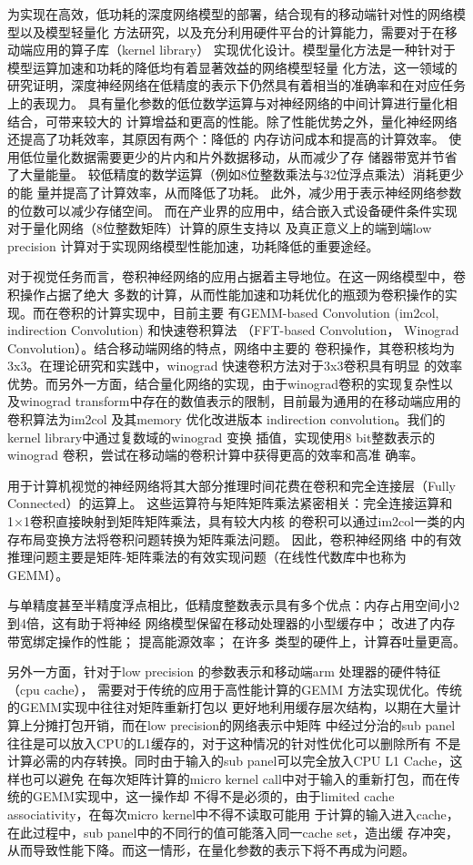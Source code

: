 为实现在高效，低功耗的深度网络模型的部署，结合现有的移动端针对性的网络模型以及模型轻量化
方法研究，以及充分利用硬件平台的计算能力，需要对于在移动端应用的算子库（kernel library）
实现优化设计。模型量化方法是一种针对于模型运算加速和功耗的降低均有着显著效益的网络模型轻量
化方法，这一领域的研究证明，深度神经网络在低精度的表示下仍然具有着相当的准确率和在对应任务
上的表现力。 具有量化参数的低位数学运算与对神经网络的中间计算进行量化相结合，可带来较大的
计算增益和更高的性能。除了性能优势之外，量化神经网络还提高了功耗效率，其原因有两个：降低的
内存访问成本和提高的计算效率。 使用低位量化数据需要更少的片内和片外数据移动，从而减少了存
储器带宽并节省了大量能量。 较低精度的数学运算（例如8位整数乘法与32位浮点乘法）消耗更少的能
量并提高了计算效率，从而降低了功耗。 此外，减少用于表示神经网络参数的位数可以减少存储空间。
而在产业界的应用中，结合嵌入式设备硬件条件实现对于量化网络（8位整数矩阵）计算的原生支持以
及真正意义上的端到端low precision 计算对于实现网络模型性能加速，功耗降低的重要途经。

对于视觉任务而言，卷积神经网络的应用占据着主导地位。在这一网络模型中，卷积操作占据了绝大
多数的计算，从而性能加速和功耗优化的瓶颈为卷积操作的实现。而在卷积的计算实现中，目前主要
有GEMM-based Convolution (im2col, indirection Convolution) 和快速卷积算法
（FFT-based Convolution， Winograd Convolution）。结合移动端网络的特点，网络中主要的
卷积操作，其卷积核均为3x3。在理论研究和实践中，winograd 快速卷积方法对于3x3卷积具有明显
的效率优势。而另外一方面，结合量化网络的实现，由于winograd卷积的实现复杂性以及winograd 
transform中存在的数值表示的限制，目前最为通用的在移动端应用的卷积算法为im2col 及其memory 
优化改进版本 indirection convolution。我们的kernel library中通过复数域的winograd 变换
插值，实现使用8 bit整数表示的winograd 卷积，尝试在移动端的卷积计算中获得更高的效率和高准
确率。

用于计算机视觉的神经网络将其大部分推理时间花费在卷积和完全连接层（Fully Connected）的运算上。
这些运算符与矩阵矩阵乘法紧密相关：完全连接运算和1×1卷积直接映射到矩阵矩阵乘法，具有较大内核
的卷积可以通过im2col一类的内存布局变换方法将卷积问题转换为矩阵乘法问题。 因此，卷积神经网络
中的有效推理问题主要是矩阵-矩阵乘法的有效实现问题（在线性代数库中也称为GEMM）。

与单精度甚至半精度浮点相比，低精度整数表示具有多个优点：内存占用空间小2到4倍，这有助于将神经
网络模型保留在移动处理器的小型缓存中； 改进了内存带宽绑定操作的性能； 提高能源效率； 在许多
类型的硬件上，计算吞吐量更高。


另外一方面，针对于low precision 的参数表示和移动端arm 处理器的硬件特征（cpu cache），
需要对于传统的应用于高性能计算的GEMM 方法实现优化。传统的GEMM实现中往往对矩阵重新打包以
更好地利用缓存层次结构，以期在大量计算上分摊打包开销，而在low precision的网络表示中矩阵
中经过分治的sub panel往往是可以放入CPU的L1缓存的，对于这种情况的针对性优化可以删除所有
不是计算必需的内存转换。同时由于输入的sub panel可以完全放入CPU L1 Cache，这样也可以避免
在每次矩阵计算的micro kernel call中对于输入的重新打包，而在传统的GEMM实现中，这一操作却
不得不是必须的，由于limited cache associativity，在每次micro kernel中不得不读取可能用
于计算的输入进入cache，在此过程中，sub panel中的不同行的值可能落入同一cache set，造出缓
存冲突，从而导致性能下降。而这一情形，在量化参数的表示下将不再成为问题。


